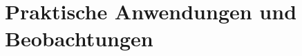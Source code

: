 \documentclass{mythesis}
\begin{document}
\section{Praktische Anwendungen und Beobachtungen}





\end{document}
